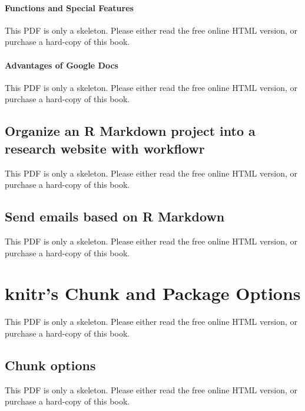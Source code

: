 \documentclass[
  11pt,
]{krantz}
\begin{document}
\subsubsection*{Functions and Special Features}\label{functions-and-special-features}

This PDF is only a skeleton. Please either read the free online HTML version, or purchase a hard-copy of this book.

\subsubsection*{Advantages of Google Docs}\label{advantages-of-google-docs}

This PDF is only a skeleton. Please either read the free online HTML version, or purchase a hard-copy of this book.

\section{\texorpdfstring{Organize an R Markdown project into a research website with \textbf{workflowr}}{Organize an R Markdown project into a research website with workflowr}}\label{workflowr}

This PDF is only a skeleton. Please either read the free online HTML version, or purchase a hard-copy of this book.

\section{Send emails based on R Markdown}\label{blastula-email}

This PDF is only a skeleton. Please either read the free online HTML version, or purchase a hard-copy of this book.

\chapter{\texorpdfstring{\textbf{knitr}'s Chunk and Package Options}{knitr's Chunk and Package Options}}\label{full-options}

This PDF is only a skeleton. Please either read the free online HTML version, or purchase a hard-copy of this book.

\section{Chunk options}\label{chunk-options-full}

This PDF is only a skeleton. Please either read the free online HTML version, or purchase a hard-copy of this book.
\end{document}
